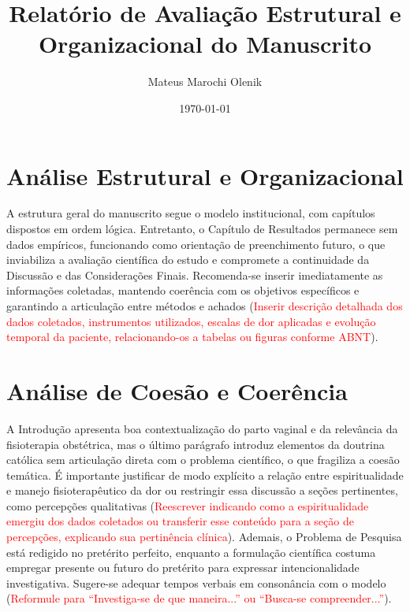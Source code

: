 \documentclass[12pt,oneside,a4paper]{article}
\begin{document}
\title{\textbf{Relatório de Avaliação Estrutural e Organizacional do Manuscrito}}
\author{Mateus Marochi Olenik}
\date{\today}

\maketitle

\tableofcontents

\section*{Análise Estrutural e Organizacional}
A estrutura geral do manuscrito segue o modelo institucional, com capítulos dispostos em ordem lógica. Entretanto, o Capítulo de Resultados permanece sem dados empíricos, funcionando como orientação de preenchimento futuro, o que inviabiliza a avaliação científica do estudo e compromete a continuidade da Discussão e das Considerações Finais. Recomenda-se inserir imediatamente as informações coletadas, mantendo coerência com os objetivos específicos e garantindo a articulação entre métodos e achados (\textcolor{red}{Inserir descrição detalhada dos dados coletados, instrumentos utilizados, escalas de dor aplicadas e evolução temporal da paciente, relacionando-os a tabelas ou figuras conforme ABNT}).

\section*{Análise de Coesão e Coerência}
A Introdução apresenta boa contextualização do parto vaginal e da relevância da fisioterapia obstétrica, mas o último parágrafo introduz elementos da doutrina católica sem articulação direta com o problema científico, o que fragiliza a coesão temática. É importante justificar de modo explícito a relação entre espiritualidade e manejo fisioterapêutico da dor ou restringir essa discussão a seções pertinentes, como percepções qualitativas (\textcolor{red}{Reescrever indicando como a espiritualidade emergiu dos dados coletados ou transferir esse conteúdo para a seção de percepções, explicando sua pertinência clínica}). Ademais, o Problema de Pesquisa está redigido no pretérito perfeito, enquanto a formulação científica costuma empregar presente ou futuro do pretérito para expressar intencionalidade investigativa. Sugere-se adequar tempos verbais em consonância com o modelo (\textcolor{red}{Reformule para ``Investiga-se de que maneira...'' ou ``Busca-se compreender...''}).
\end{document}
